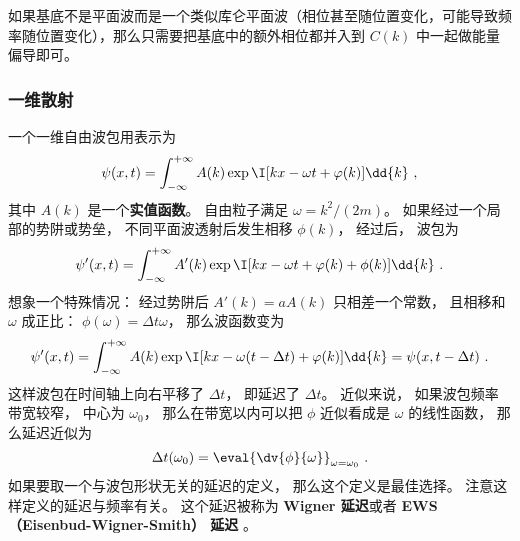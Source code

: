 如果基底不是平面波而是一个类似库仑平面波（相位甚至随位置变化，可能导致频率随位置变化），那么只需要把基底中的额外相位都并入到 $C(k)$ 中一起做能量偏导即可。

\subsubsection{一维散射}
一个一维自由波包用表示为
\begin{equation}\label{eq_tDelay_3}
\psi(x, t) = \int_{-\infty}^{+\infty} A(k) \exp \I[kx - \omega t + \varphi(k)] \dd{k}~,
\end{equation}
其中 $A(k)$ 是一个\textbf{实值函数}。 自由粒子满足 $\omega = k^2/(2m)$。 如果经过一个局部的势阱或势垒， 不同平面波透射后发生相移 $\phi(k)$， 经过后， 波包为
\begin{equation}\label{eq_tDelay_1}
\psi'(x, t) = \int_{-\infty}^{+\infty} A'(k) \exp \I[kx - \omega t + \varphi(k) + \phi(k)] \dd{k}~.
\end{equation}
想象一个特殊情况： 经过势阱后 $A'(k) = a A(k)$ 只相差一个常数， 且相移和 $\omega$ 成正比： $\phi(\omega) = \Delta t \omega$， 那么波函数变为
\begin{equation}
\psi'(x, t) = \int_{-\infty}^{+\infty} A(k) \exp \I[kx - \omega (t - \Delta t) + \varphi(k)] \dd{k}
= \psi(x, t - \Delta t)~.
\end{equation}
这样波包在时间轴上向右平移了 $\Delta t$， 即延迟了 $\Delta t$。 近似来说， 如果波包频率带宽较窄， 中心为 $\omega_0$， 那么在带宽以内可以把 $\phi$ 近似看成是 $\omega$ 的线性函数， 那么延迟近似为
\begin{equation}\label{eq_tDelay_2}
\Delta t(\omega_0) = \eval{\dv{\phi}{\omega}}_{\omega = \omega_0}~.
\end{equation}
如果要取一个与波包形状无关的延迟的定义， 那么这个定义是最佳选择。 注意这样定义的延迟与频率有关。 这个延迟被称为 \textbf{Wigner 延迟}或者 \textbf{EWS （Eisenbud-Wigner-Smith） 延迟} 。

